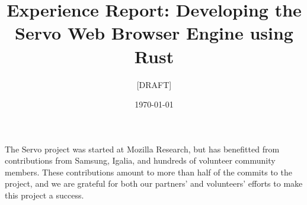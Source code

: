 \documentclass[preprint,onecolumn]{../common/sigplanconf}
\title{Experience Report: Developing the Servo Web Browser Engine using Rust}
\subtitle{[DRAFT]}
\date{\today}
\begin{document}
\maketitle
\thispagestyle{empty}

\sloppy









\acks
The Servo project was started at Mozilla Research, but has benefitted from
contributions from Samsung, Igalia, and hundreds of volunteer community members.
These contributions amount to more than half of the commits to the project,
and we are grateful for both our partners' and volunteers' efforts to make
this project a success.




\end{document}

